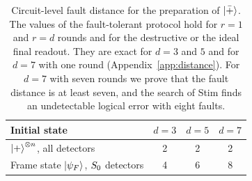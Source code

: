 \begin{table}[t]
  \caption{Circuit-level fault distance for the preparation of $\left|\bar{+}\right\rangle$. The values of the fault-tolerant protocol hold for $r=1$ and $r=d$ rounds and for the destructive or the ideal final readout. They are exact for $d=3$ and $5$ and for $d=7$ with one round (Appendix~\ref{app:distance}). For $d=7$ with seven rounds we prove that the fault distance is at least seven, and the search of Stim finds an undetectable logical error with eight faults.}
  \label{tab:fd}
  \begin{ruledtabular}
  \begin{tabular}{lccc}
    Initial state & $d=3$ & $d=5$ & $d=7$ \\
    \hline
    $\left|+\right\rangle^{\otimes n}$, all detectors & 2 & 2 & 2 \\
    Frame state $\left|\psi_F\right\rangle$, $S_0$ detectors & 4 & 6 & 8 \\
  \end{tabular}
  \end{ruledtabular}
\end{table}

